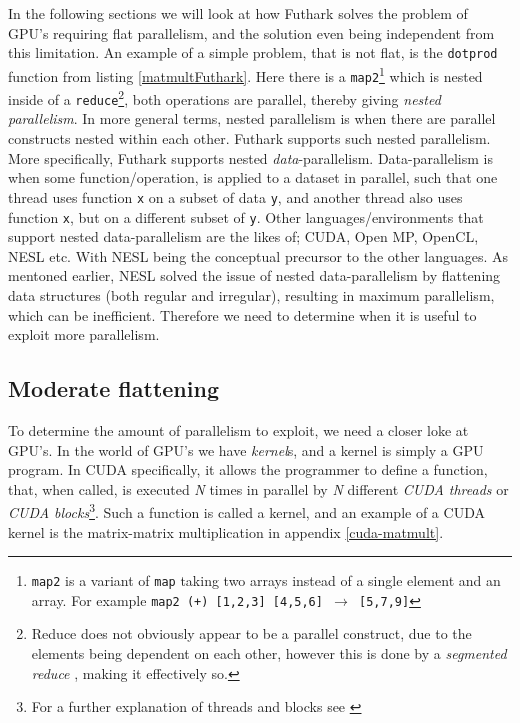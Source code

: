 In the following sections we will look at how Futhark solves the problem of
GPU's requiring flat parallelism, and the solution even being independent from
this limitation. An example of a simple problem, that is not flat, is the
\texttt{dotprod} function from listing \ref{matmultFuthark}. Here there is a \texttt{map2}\footnote{\texttt{map2} is a variant of \texttt{map} taking two arrays instead of a single element and an array. For example \texttt{map2 (+) [1,2,3] [4,5,6] $\to$ [5,7,9]}} which is nested inside of a \texttt{reduce}\footnote{Reduce does not obviously appear to be a parallel construct, due to the elements being dependent on each other, however this is done by a \textit{segmented reduce} \cite{segred}, making it effectively so.}, both operations are parallel, thereby giving \textit{nested parallelism}. In more general terms, nested parallelism is when there are parallel constructs nested within each other. Futhark supports such nested parallelism. More specifically, Futhark supports nested \textit{data}-parallelism. Data-parallelism is when some function/operation, is applied to a dataset in parallel, such that one thread uses function \texttt{x} on a subset of data \texttt{y}, and another thread also uses function \texttt{x}, but on a different subset of \texttt{y}. Other languages/environments that support nested data-parallelism are the likes of; CUDA, Open MP, OpenCL, NESL etc. With NESL being the conceptual precursor to the other languages. As mentoned earlier, NESL solved the issue of nested data-parallelism by flattening data structures (both regular and irregular), resulting in maximum parallelism, which can be inefficient. Therefore we need to determine when it is useful to exploit more parallelism. 

\subsection{Moderate flattening}
To determine the amount of parallelism to exploit, we need a closer loke at GPU's. In the world of GPU's we have \textit{kernel}s, and a kernel is simply a GPU program. In CUDA specifically, it allows the programmer to define a function, that, when called, is executed \textit{N} times in parallel by \textit{N} different \textit{CUDA threads} or \textit{CUDA blocks}\footnote{For a further explanation of threads and blocks see \cite[p. 5-9]{prog-guide-cuda}}. Such a function is called a kernel, and an example of a CUDA kernel is the matrix-matrix multiplication in appendix \ref{cuda-matmult}. 

